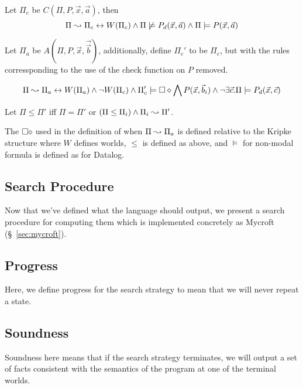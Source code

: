 Let $\Pi_c$ be $C(\Pi, P, \vec{x}, \vec{a})$, then
\[
	\Pi \leadsto \Pi_c \leftrightarrow W(\Pi_c) \wedge \Pi \not \models P_d(\vec{x}, \vec{a}) \wedge \Pi \models P(\vec{x}, \vec{a})
\]

Let $\Pi_a$ be $A(\Pi, P, \vec{x}, \vec{\vec{b}})$, additionally, define $\Pi_c'$ to be $\Pi_c$, but with the rules corressponding to the use of the check function on $P$ removed.

\[
	\Pi \leadsto \Pi_a \leftrightarrow W(\Pi_a) \wedge \neg W(\Pi_c) \wedge \Pi_c' \models \square \diamond \bigwedge P(\vec{x}, \vec{b}_i) \wedge \neg \exists \vec{c}. \Pi \models P_d(\vec{x}, \vec{c})
\]

Let $\Pi \leq \Pi'$ iff $\Pi = \Pi'$ or $(\Pi \leq \Pi_i) \wedge \Pi_i \leadsto \Pi'$.

The $\square \diamond$ used in the definition of when $\Pi \leadsto \Pi_a$ is defined relative to the Kripke structure where $W$ defines worlds, $\leq$ is defined as above, and $\models$ for non-modal formula is defined as for Datalog.
\subsection{Search Procedure}
\label{sec:search}
Now that we've defined what the language should output, we present a search procedure for computing them which is implemented concretely as Mycroft (\S~\ref{sec:mycroft}).
\subsection{Progress}
\label{sec:progress}
Here, we define progress for the search strategy to mean that we will never repeat a state.
\subsection{Soundness}
\label{sec:soundness}
Soundness here means that if the search strategy terminates, we will output a set of facts consistent with the semantics of the program at one of the terminal worlds.
